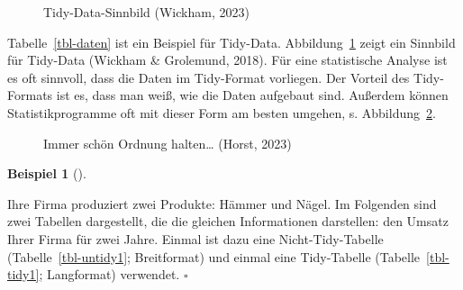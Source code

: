 \documentclass[
  letterpaper,
  twoside,
  open=any]{scrbook}
\theoremstyle{definition}
\theoremstyle{definition}
\newtheorem{example}{Beispiel}[chapter]
\theoremstyle{definition}
\theoremstyle{remark}
\begin{document}
\begin{figure}


\caption{\label{fig-tidy1}Tidy-Data-Sinnbild (Wickham, 2023)}

\end{figure}%

Tabelle~\ref{tbl-daten} ist ein Beispiel für Tidy-Data.
Abbildung~\ref{fig-tidy1} zeigt ein Sinnbild für Tidy-Data (Wickham \&
Grolemund, 2018). Für eine statistische Analyse ist es oft sinnvoll,
dass die Daten im Tidy-Format vorliegen. Der Vorteil des Tidy-Formats
ist es, dass man weiß, wie die Daten aufgebaut sind. Außerdem können
Statistikprogramme oft mit dieser Form am besten umgehen, s.
Abbildung~\ref{fig-tidy3}.

\begin{figure}


\caption{\label{fig-tidy3}Immer schön Ordnung halten\ldots{} (Horst,
2023)}

\end{figure}%

\begin{example}[]\protect\hypertarget{exm-widelong}{}\label{exm-widelong}

Ihre Firma produziert zwei Produkte: Hämmer und Nägel. Im Folgenden sind
zwei Tabellen dargestellt, die die gleichen Informationen darstellen:
den Umsatz Ihrer Firma für zwei Jahre. Einmal ist dazu eine
Nicht-Tidy-Tabelle (Tabelle~\ref{tbl-untidy1}; Breitformat) und einmal
eine Tidy-Tabelle (Tabelle~\ref{tbl-tidy1}; Langformat) verwendet.
\(\square\)

\end{example}
\end{document}
